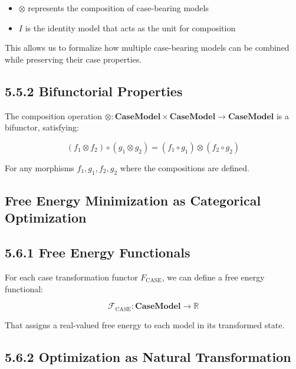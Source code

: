 \documentclass[
  11pt,
  letterpaper,
]{article}
\providecommand{\tightlist}{%
  \setlength{\itemsep}{0pt}\setlength{\parskip}{0pt}}
\begin{document}
\begin{itemize}
\tightlist
\item
  \(\otimes\) represents the composition of case-bearing models
\item
  \(I\) is the identity model that acts as the unit for composition
\end{itemize}

This allows us to formalize how multiple case-bearing models can be
combined while preserving their case properties.

\hypertarget{bifunctorial-properties}{%
\subsection{5.5.2 Bifunctorial
Properties}\label{bifunctorial-properties}}

The composition operation
\(\otimes: \mathbf{CaseModel} \times \mathbf{CaseModel} \rightarrow \mathbf{CaseModel}\)
is a bifunctor, satisfying:

\[(f_1 \otimes f_2) \circ (g_1 \otimes g_2) = (f_1 \circ g_1) \otimes (f_2 \circ g_2)\]

For any morphisms \(f_1, g_1, f_2, g_2\) where the compositions are
defined.

\hypertarget{free-energy-minimization-as-categorical-optimization}{%
\subsection{Free Energy Minimization as Categorical
Optimization}\label{free-energy-minimization-as-categorical-optimization}}

\hypertarget{free-energy-functionals}{%
\subsection{5.6.1 Free Energy
Functionals}\label{free-energy-functionals}}

For each case transformation functor \(F_{\text{CASE}}\), we can define
a free energy functional:

\[\mathcal{F}_{\text{CASE}}: \mathbf{CaseModel} \rightarrow \mathbb{R}\]

That assigns a real-valued free energy to each model in its transformed
state.

\hypertarget{optimization-as-natural-transformation}{%
\subsection{5.6.2 Optimization as Natural
Transformation}\label{optimization-as-natural-transformation}}
\end{document}
